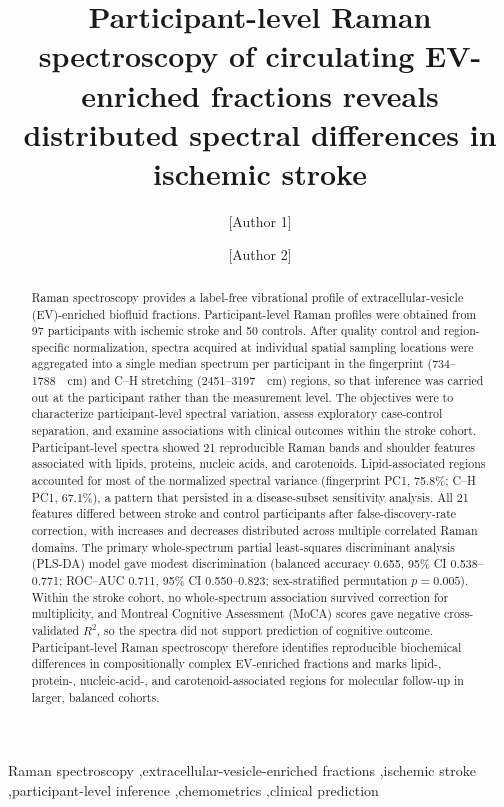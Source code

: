 \documentclass[preprint,12pt]{elsarticle}
\begin{document}
\linenumbers

\begin{frontmatter}


\title{Participant-level Raman spectroscopy of circulating EV-enriched fractions reveals distributed spectral differences in ischemic stroke}


\author[1]{[Author 1]}   \author[1,2]{[Author 2]}

 

\begin{abstract}
Raman spectroscopy provides a label-free vibrational profile of extracellular-vesicle (EV)-enriched biofluid fractions. Participant-level Raman profiles were obtained from 97 participants with ischemic stroke and 50 controls. After quality control and region-specific normalization, spectra acquired at individual spatial sampling locations were aggregated into a single median spectrum per participant in the fingerprint (734--1788~\si{\per\centi\metre}) and C--H stretching (2451--3197~\si{\per\centi\metre}) regions, so that inference was carried out at the participant rather than the measurement level. The objectives were to characterize participant-level spectral variation, assess exploratory case-control separation, and examine associations with clinical outcomes within the stroke cohort. Participant-level spectra showed 21 reproducible Raman bands and shoulder features associated with lipids, proteins, nucleic acids, and carotenoids. Lipid-associated regions accounted for most of the normalized spectral variance (fingerprint PC1, 75.8\%; C--H PC1, 67.1\%), a pattern that persisted in a disease-subset sensitivity analysis. All 21 features differed between stroke and control participants after false-discovery-rate correction, with increases and decreases distributed across multiple correlated Raman domains. The primary whole-spectrum partial least-squares discriminant analysis (PLS-DA) model gave modest discrimination (balanced accuracy 0.655, 95\% CI 0.538--0.771; ROC--AUC 0.711, 95\% CI 0.550--0.823; sex-stratified permutation $p=0.005$). Within the stroke cohort, no whole-spectrum association survived correction for multiplicity, and Montreal Cognitive Assessment (MoCA) scores gave negative cross-validated $R^2$, so the spectra did not support prediction of cognitive outcome. Participant-level Raman spectroscopy therefore identifies reproducible biochemical differences in compositionally complex EV-enriched fractions and marks lipid-, protein-, nucleic-acid-, and carotenoid-associated regions for molecular follow-up in larger, balanced cohorts.
\end{abstract}

\begin{keyword} Raman spectroscopy \sep extracellular-vesicle-enriched fractions \sep ischemic stroke \sep participant-level inference \sep chemometrics \sep clinical prediction \end{keyword}

\end{frontmatter}
\end{document}
